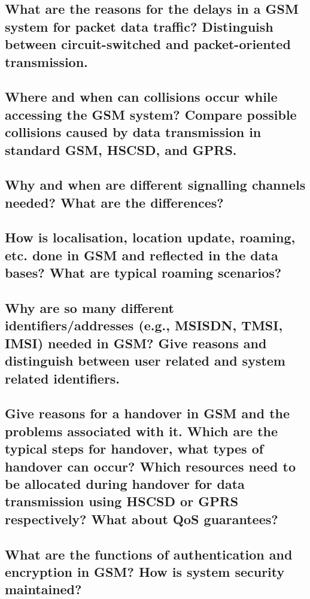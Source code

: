 \subsection{What are the reasons for the delays in a GSM system for packet data traffic?
Distinguish between circuit-switched and packet-oriented transmission.}

\subsection{Where and when can collisions occur while accessing the GSM system? Compare
possible collisions caused by data transmission in standard GSM, HSCSD, and
GPRS.}

\subsection{Why and when are different signalling channels needed? What are the differences?}

\subsection{How is localisation, location update, roaming, etc. done in GSM and reflected in the
data bases? What are typical roaming scenarios?}

\subsection{Why are so many different identifiers/addresses (e.g., MSISDN, TMSI, IMSI) needed
in GSM? Give reasons and distinguish between user related and system related
identifiers.}

\subsection{Give reasons for a handover in GSM and the problems associated with it. Which are
the typical steps for handover, what types of handover can occur? Which resources
need to be allocated during handover for data transmission using HSCSD or GPRS
respectively? What about QoS guarantees?}

\subsection{What are the functions of authentication and encryption in GSM? How is system
security maintained?}

